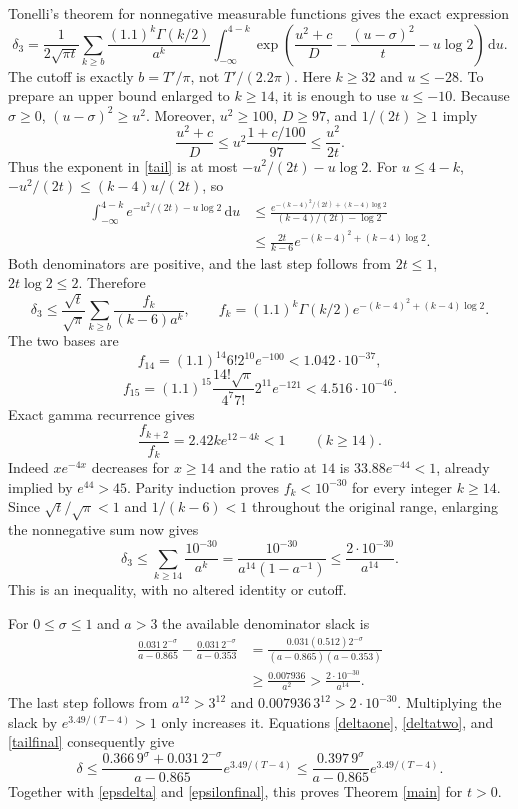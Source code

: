 \documentclass[11pt]{article}
\newcommand{\dd}{\,\mathrm d}
\begin{document}
Tonelli's theorem for nonnegative measurable functions gives the
exact expression
\begin{equation}\label{tail}
 \delta_3=\frac1{2\sqrt{\pi t}}
 \sum_{k\ge b}\frac{(1.1)^k\Gamma(k/2)}{a^k}
 \int_{-\infty}^{4-k}
 \exp\!\left(\frac{u^2+c}D-\frac{(u-\sigma)^2}t-u\log2\right)\dd u.
\end{equation}
The cutoff is exactly $b=T'/\pi$, not $T'/(2.2\pi)$.
Here $k\ge32$ and $u\le-28$. To prepare an upper bound enlarged
to $k\ge14$, it is enough to use $u\le-10$. Because $\sigma\ge0$,
$(u-\sigma)^2\ge u^2$. Moreover, $u^2\ge100$, $D\ge97$,
and $1/(2t)\ge1$ imply
\[
 \frac{u^2+c}D
 \le u^2\frac{1+c/100}{97}\le\frac{u^2}{2t}.
\]
Thus the exponent in \eqref{tail} is at most
$-u^2/(2t)-u\log2$. For $u\le4-k$,
$-u^2/(2t)\le(k-4)u/(2t)$, so
\begin{align*}
 \int_{-\infty}^{4-k}e^{-u^2/(2t)-u\log2}\dd u
 &\le\frac{e^{-(k-4)^2/(2t)+(k-4)\log2}}
                {(k-4)/(2t)-\log2}\\
 &\le\frac{2t}{k-6}e^{-(k-4)^2+(k-4)\log2}.
\end{align*}
Both denominators are positive, and the last step follows from
$2t\le1$, $2t\log2\le2$. Therefore
\[
 \delta_3\le\frac{\sqrt t}{\sqrt\pi}
 \sum_{k\ge b}\frac{f_k}{(k-6)a^k},\qquad
 f_k=(1.1)^k\Gamma(k/2)e^{-(k-4)^2+(k-4)\log2}.
\]
The two bases are
\[
 f_{14}=(1.1)^{14}6!2^{10}e^{-100}<1.042\cdot10^{-37},
\]
\[
 f_{15}=(1.1)^{15}\frac{14!\sqrt\pi}{4^7 7!}2^{11}e^{-121}
                                         <4.516\cdot10^{-46}.
\]
Exact gamma recurrence gives
\[
 \frac{f_{k+2}}{f_k}=2.42k e^{12-4k}<1\qquad(k\ge14).
\]
Indeed $x e^{-4x}$ decreases for $x\ge14$ and the ratio at $14$
is $33.88e^{-44}<1$, already implied by $e^{44}>45$.
Parity induction proves $f_k<10^{-30}$ for every integer $k\ge14$.
Since $\sqrt t/\sqrt\pi<1$ and $1/(k-6)<1$ throughout the
original range, enlarging the nonnegative sum now gives
\begin{equation}\label{tailfinal}
 \delta_3\le\sum_{k\ge14}\frac{10^{-30}}{a^k}
 =\frac{10^{-30}}{a^{14}(1-a^{-1})}
 \le\frac{2\cdot10^{-30}}{a^{14}}.
\end{equation}
This is an inequality, with no altered identity or cutoff.

For $0\le\sigma\le1$ and $a>3$ the available denominator slack is
\begin{align*}
 \frac{0.031\,2^{-\sigma}}{a-0.865}
 -\frac{0.031\,2^{-\sigma}}{a-0.353}
 &=\frac{0.031(0.512)2^{-\sigma}}
          {(a-0.865)(a-0.353)}\\
 &\ge\frac{0.007936}{a^2}
 >\frac{2\cdot10^{-30}}{a^{14}}.
\end{align*}
The last step follows from $a^{12}>3^{12}$ and
$0.007936\,3^{12}>2\cdot10^{-30}$. Multiplying the slack by
$e^{3.49/(T-4)}>1$ only increases it. Equations \eqref{deltaone},
\eqref{deltatwo}, and \eqref{tailfinal} consequently give
\[
 \delta\le\frac{0.366\,9^\sigma+0.031\,2^{-\sigma}}{a-0.865}
                       e^{3.49/(T-4)}
 \le\frac{0.397\,9^\sigma}{a-0.865}e^{3.49/(T-4)}.
\]
Together with \eqref{epsdelta} and \eqref{epsilonfinal}, this proves
Theorem \ref{main} for $t>0$.
\end{document}
